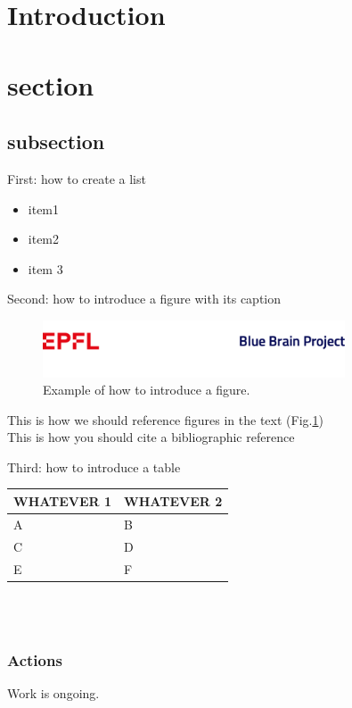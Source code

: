 
\section{Introduction}

\section{section}

\subsection{subsection}

First: how to create a list
\begin{itemize}
\item item1
\item item2
\item item 3
\end{itemize}

Second: how to introduce a figure with its caption
\begin{figure}[h!]
\includegraphics[width=0.8\textwidth]{figs/Last.png}
\caption{Example of how to introduce a figure.}
\label{fig_test}
\end{figure}


This is how we should reference figures in the text (Fig.\ref{fig_test}) \\

This is how you should cite a bibliographic reference \citet{richardson2008measurement}

Third: how to introduce a table\\

\begin{tabular}{ | p{5cm} | p{5cm} |}\hline
WHATEVER 1 & WHATEVER 2 \\ \hline
A & B\\ \hline
C & D\\ \hline
E & F\\ \hline
\end{tabular}\\ \\


\subsubsection{Actions}
Work is ongoing.


{}
